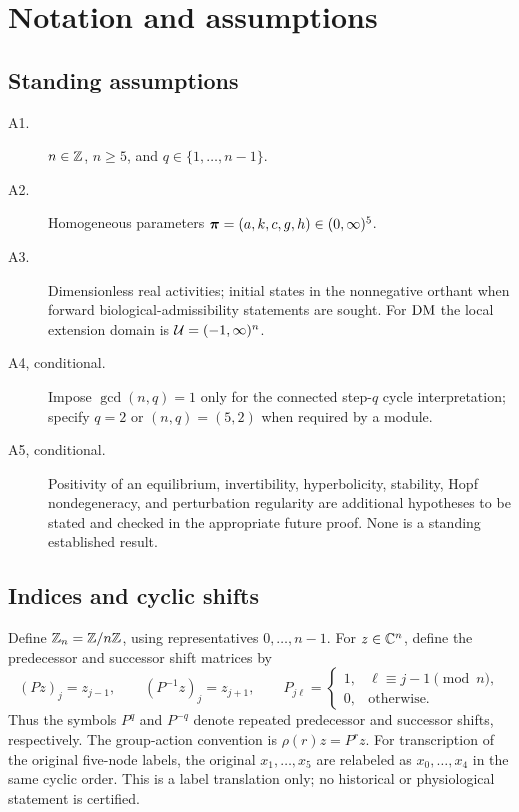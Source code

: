 \section{Notation and assumptions}
\label{sec:notation}
\subsection{Standing assumptions}
\begin{description}
\item[A1.] $n\in\mathbb{Z}$, $n\geq5$, and $q\in\{1,\ldots,n-1\}$.
\item[A2.] Homogeneous parameters $\boldsymbol{\pi}=(a,k,c,g,h)\in(0,\infty)^5$.
\item[A3.] Dimensionless real activities; initial states in the nonnegative
orthant when forward biological-admissibility statements are sought.
For $\mathrm{DM}$ the local extension domain is $\mathcal{U}=(-1,\infty)^n$.
\item[A4, conditional.] Impose $\gcd(n,q)=1$ only for the connected step-$q$
cycle interpretation; specify $q=2$ or $(n,q)=(5,2)$ when required by a module.
\item[A5, conditional.] Positivity of an equilibrium, invertibility,
hyperbolicity, stability, Hopf nondegeneracy, and perturbation regularity are
additional hypotheses to be stated and checked in the appropriate future proof.
None is a standing established result.
\end{description}

\subsection{Indices and cyclic shifts}
Define $\mathbb{Z}_n=\mathbb{Z}/n\mathbb{Z}$, using representatives $0,\ldots,n-1$.
For $z\in\mathbb{C}^n$, define the predecessor and successor shift matrices by
\[
(Pz)_j=z_{j-1},\qquad(P^{-1}z)_j=z_{j+1},\qquad
P_{j\ell}=\begin{cases}1,&\ell\equiv j-1\pmod n,\\0,&\text{otherwise.}\end{cases}
\]
Thus the symbols $P^q$ and $P^{-q}$ denote repeated predecessor and successor
shifts, respectively. The group-action convention is $\rho(r)z=P^r z$.
For transcription of the original five-node labels, the original $x_1,\ldots,x_5$
are relabeled as $x_0,\ldots,x_4$ in the same cyclic order. This is a label
translation only; no historical or physiological statement is certified.

